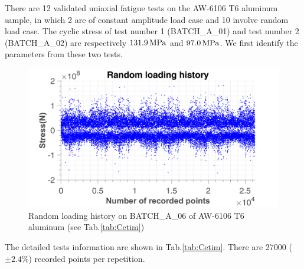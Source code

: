There are 12 validated uniaxial fatigue tests on the AW-6106 T6 aluminum sample, in which 2 are of constant amplitude load case and 10 involve random  load case. 
The cyclic stress of test number 1 (BATCH\_A\_01) and test number 2 (BATCH\_A\_02) are respectively $131.9\,\textnormal{MPa}$ and $97.0\,\textnormal{MPa}$. We first identify the parameters from these two tests. 

\begin{figure}[!h]
\centering
\includegraphics[width=\textwidth]{figures//EP_a_06_random.png} 
\caption{Random loading history on BATCH\_A\_06 of AW-6106 T6 aluminum (see Tab.\ref{tab:Cetim})}
\end{figure}	
The detailed tests information are shown in Tab.\ref{tab:Cetim}. There are 27000 ($\pm 2.4\%$) recorded points per repetition. 

